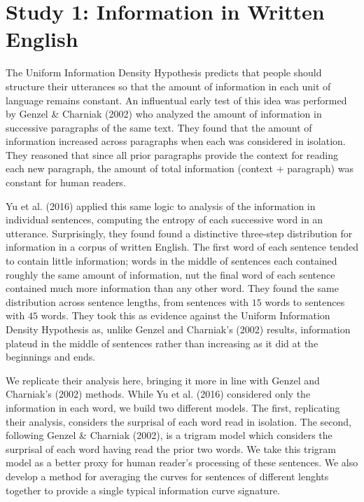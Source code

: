 \documentclass[10pt, letterpaper]{article}
\begin{document}
\hypertarget{study-1-information-in-written-english}{%
\section{Study 1: Information in Written
English}\label{study-1-information-in-written-english}}

The Uniform Information Density Hypothesis predicts that people should
structure their utterances so that the amount of information in each
unit of language remains constant. An influentual early test of this
idea was performed by Genzel \& Charniak (2002) who analyzed the amount
of information in successive paragraphs of the same text. They found
that the amount of information increased across paragraphs when each was
considered in isolation. They reasoned that since all prior paragraphs
provide the context for reading each new paragraph, the amount of total
information (context + paragraph) was constant for human readers.

Yu et al. (2016) applied this same logic to analysis of the information
in individual sentences, computing the entropy of each successive word
in an utterance. Surprisingly, they found found a distinctive three-step
distribution for information in a corpus of written English. The first
word of each sentence tended to contain little information; words in the
middle of sentences each contained roughly the same amount of
information, nut the final word of each sentence contained much more
information than any other word. They found the same distribution across
sentence lengths, from sentences with \(15\) words to sentences with
\(45\) words. They took this as evidence against the Uniform Information
Density Hypothesis as, unlike Genzel and Charniak's (2002) results,
information plateud in the middle of sentences rather than increasing as
it did at the beginnings and ends.

We replicate their analysis here, bringing it more in line with Genzel
and Charniak's (2002) methods. While Yu et al. (2016) considered only
the information in each word, we build two different models. The first,
replicating their analysis, considers the surprisal of each word read in
isolation. The second, following Genzel \& Charniak (2002), is a trigram
model which considers the surprisal of each word having read the prior
two words. We take this trigram model as a better proxy for human
reader's processing of these sentences. We also develop a method for
averaging the curves for sentences of different lenghts together to
provide a single typical information curve signature.
\end{document}
